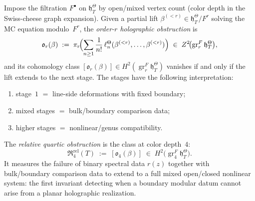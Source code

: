 \begin{definition}%
\label{def:holographic-obstruction-tower}%
%
Impose the filtration $F^\bullet$ on
$\mathfrak{h}_T^\Theta$ by open/mixed vertex count
\textup{(}color depth in the Swiss-cheese graph
expansion\textup{)}.
Given a partial lift
$\beta^{(<r)} \in \mathfrak{h}_T^\Theta / F^r$
solving the MC equation modulo~$F^r$, the
\emph{order-$r$ holographic obstruction} is
\begin{equation}\label{eq:holographic-obstruction}
\mathfrak{o}_r(\beta)
\;:=\;
\pi_r\!\Bigl(
\sum_{n \geq 1}\frac{1}{n!}\,
\ell_n^\Theta(\beta^{(<r)},\ldots,\beta^{(<r)})
\Bigr)
\;\in\;
Z^2\!\bigl(\operatorname{gr}^F_r
\mathfrak{h}_T^\Theta\bigr),
\end{equation}
and its cohomology class
$[\mathfrak{o}_r(\beta)]
\in H^2(\operatorname{gr}^F_r \mathfrak{h}_T^\Theta)$
vanishes if and only if the lift extends to the next
stage. The stages have the following interpretation\textup:
\begin{enumerate}[label=\textup{(\roman*)}]
\item stage~$1$ $=$ line-side deformations with fixed
 boundary\textup;
\item mixed stages $=$ bulk/boundary comparison
 data\textup;
\item higher stages $=$ nonlinear/genus compatibility.
\end{enumerate}
\end{definition}

\begin{definition}%
\label{def:relative-quartic-obstruction}%
%
%
The \emph{relative quartic obstruction} is the
class at color depth~$4$\textup:
\begin{equation}\label{eq:relative-quartic}
\mathfrak{R}_4^{\mathrm{rel}}(T)
\;:=\;
[\mathfrak{o}_4(\beta)]
\;\in\;
H^2\!\bigl(\operatorname{gr}^F_4
\mathfrak{h}_T^\Theta\bigr).
\end{equation}
It measures the failure of binary spectral data
$r(z)$ together with bulk/boundary comparison data
to extend to a full mixed open/closed nonlinear
system\textup: the first invariant detecting when
a boundary modular datum cannot arise from a planar
holographic realization.
\end{definition}

